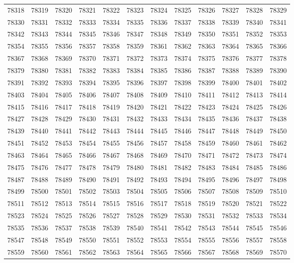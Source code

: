 \begin{center}
\begin{longtable}{llllllllllll}
78318 &78319 &78320 &78321 &78322 &78323 &78324 &78325 &78326 &78327 &78328 &78329 \\
78330 &78331 &78332 &78333 &78334 &78335 &78336 &78337 &78338 &78339 &78340 &78341 \\
78342 &78343 &78344 &78345 &78346 &78347 &78348 &78349 &78350 &78351 &78352 &78353 \\
78354 &78355 &78356 &78357 &78358 &78359 &78361 &78362 &78363 &78364 &78365 &78366 \\
78367 &78368 &78369 &78370 &78371 &78372 &78373 &78374 &78375 &78376 &78377 &78378 \\
78379 &78380 &78381 &78382 &78383 &78384 &78385 &78386 &78387 &78388 &78389 &78390 \\
78391 &78392 &78393 &78394 &78395 &78396 &78397 &78398 &78399 &78400 &78401 &78402 \\
78403 &78404 &78405 &78406 &78407 &78408 &78409 &78410 &78411 &78412 &78413 &78414 \\
78415 &78416 &78417 &78418 &78419 &78420 &78421 &78422 &78423 &78424 &78425 &78426 \\
78427 &78428 &78429 &78430 &78431 &78432 &78433 &78434 &78435 &78436 &78437 &78438 \\
78439 &78440 &78441 &78442 &78443 &78444 &78445 &78446 &78447 &78448 &78449 &78450 \\
78451 &78452 &78453 &78454 &78455 &78456 &78457 &78458 &78459 &78460 &78461 &78462 \\
78463 &78464 &78465 &78466 &78467 &78468 &78469 &78470 &78471 &78472 &78473 &78474 \\
78475 &78476 &78477 &78478 &78479 &78480 &78481 &78482 &78483 &78484 &78485 &78486 \\
78487 &78488 &78489 &78490 &78491 &78492 &78493 &78494 &78495 &78496 &78497 &78498 \\
78499 &78500 &78501 &78502 &78503 &78504 &78505 &78506 &78507 &78508 &78509 &78510 \\
78511 &78512 &78513 &78514 &78515 &78516 &78517 &78518 &78519 &78520 &78521 &78522 \\
78523 &78524 &78525 &78526 &78527 &78528 &78529 &78530 &78531 &78532 &78533 &78534 \\
78535 &78536 &78537 &78538 &78539 &78540 &78541 &78542 &78543 &78544 &78545 &78546 \\
78547 &78548 &78549 &78550 &78551 &78552 &78553 &78554 &78555 &78556 &78557 &78558 \\
78559 &78560 &78561 &78562 &78563 &78564 &78565 &78566 &78567 &78568 &78569 &78570 \\

\end{longtable}
\end{center}
